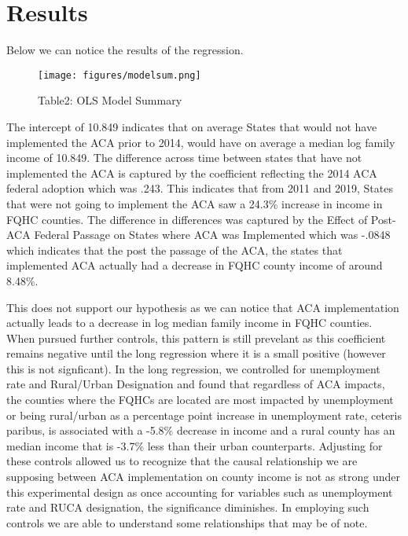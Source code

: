 \documentclass[12pt, ]{article}
\begin{document}
\hypertarget{results}{%
\section{Results}\label{results}}

Below we can notice the results of the regression.

\begin{figure}[tbp]

{\centering \texttt{[image: figures/modelsum.png]}

}

\caption{\label{fig-6}Table2: OLS Model Summary}

\end{figure}

The intercept of 10.849 indicates that on average States that would not
have implemented the ACA prior to 2014, would have on average a median
log family income of 10.849. The difference across time between states
that have not implemented the ACA is captured by the coefficient
reflecting the 2014 ACA federal adoption which was .243. This indicates
that from 2011 and 2019, States that were not going to implement the ACA
saw a 24.3\% increase in income in FQHC counties. The difference in
differences was captured by the Effect of Post-ACA Federal Passage on
States where ACA was Implemented which was -.0848 which indicates that
the post the passage of the ACA, the states that implemented ACA
actually had a decrease in FQHC county income of around 8.48\%.

This does not support our hypothesis as we can notice that ACA
implementation actually leads to a decrease in log median family income
in FQHC counties. When pursued further controls, this pattern is still
prevelant as this coefficient remains negative until the long regression
where it is a small positive (however this is not signficant). In the
long regression, we controlled for unemployment rate and Rural/Urban
Designation and found that regardless of ACA impacts, the counties where
the FQHCs are located are most impacted by unemployment or being
rural/urban as a percentage point increase in unemployment rate, ceteris
paribus, is associated with a -5.8\% decrease in income and a rural
county has an median income that is -3.7\% less than their urban
counterparts. Adjusting for these controls allowed us to recognize that
the causal relationship we are supposing between ACA implementation on
county income is not as strong under this experimental design as once
accounting for variables such as unemployment rate and RUCA designation,
the significance diminishes. In employing such controls we are able to
understand some relationships that may be of note.
\end{document}

